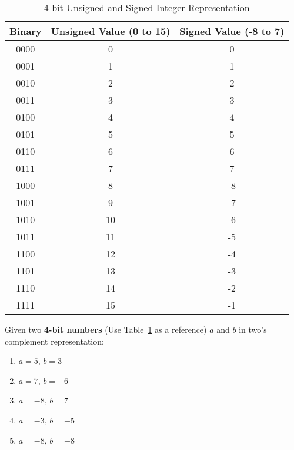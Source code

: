 \begin{table}[h]
    \centering
    \renewcommand{\arraystretch}{1.2}
    \begin{tabular}{|c|c|c|}
        \hline
        \textbf{Binary} & \textbf{Unsigned Value (0 to 15)} & \textbf{Signed Value (-8 to 7)} \\
        \hline
        0000 & 0  & 0  \\
        0001 & 1  & 1  \\
        0010 & 2  & 2  \\
        0011 & 3  & 3  \\
        0100 & 4  & 4  \\
        0101 & 5  & 5  \\
        0110 & 6  & 6  \\
        0111 & 7  & 7  \\
        1000 & 8  & -8 \\
        1001 & 9  & -7 \\
        1010 & 10 & -6 \\
        1011 & 11 & -5 \\
        1100 & 12 & -4 \\
        1101 & 13 & -3 \\
        1110 & 14 & -2 \\
        1111 & 15 & -1 \\
        \hline
    \end{tabular}
    \caption{4-bit Unsigned and Signed Integer Representation}
    \label{four-bit-int}
\end{table}


Given two \textbf{4-bit numbers} (Use Table~\ref{four-bit-int} as a reference) 
$a$ and $b$ in two’s complement representation:

\begin{enumerate}
    \item $a = 5$, $b = 3$
    \item $a = 7$, $b = -6$
    \item $a = -8$, $b = 7$
    \item $a = -3$, $b = -5$
    \item $a = -8$, $b = -8$
\end{enumerate}

